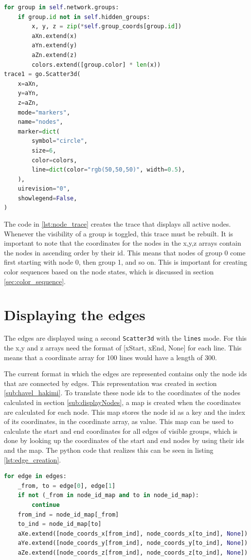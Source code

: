 \begin{lstlisting}[language=python, caption={Creation of the node trace}, label={lst:node_trace}]
for group in self.network.groups:
    if group.id not in self.hidden_groups:
        x, y, z = zip(*self.group_coords[group.id])
        aXn.extend(x)
        aYn.extend(y)
        aZn.extend(z)
        colors.extend([group.color] * len(x))
trace1 = go.Scatter3d(
    x=aXn,
    y=aYn,
    z=aZn,
    mode="markers",
    name="nodes",
    marker=dict(
        symbol="circle",
        size=6,
        color=colors,
        line=dict(color="rgb(50,50,50)", width=0.5),
    ),
    uirevision="0",
    showlegend=False,
)
\end{lstlisting}

The code in \ref{lst:node_trace} creates the trace that displays all active nodes. Whenever the visibility of a group is toggled, this trace must be rebuilt. It is important to note that the coordinates for the nodes in the x,y,z arrays contain the nodes in ascending order by their id. This means that nodes of group 0 come first starting with node 0, then group 1, and so on. This is important for creating color sequences based on the node states, which is discussed in section \ref{sec:color_sequence}.

\section{Displaying the edges}
The edges are displayed using a second \texttt{Scatter3d} with the \texttt{lines} mode. For this the x,y and z arrays need the format of [xStart, xEnd, None] for each line. This means that a coordinate array for 100 lines would have a length of 300.

The current format in which the edges are represented contains only the node ids that are connected by edges. This representation was created in section \ref{sub:havel_hakimi}. To translate these node ids to the coordinates of the nodes calculated in section \ref{sub:displayNodes}, a map is created when the coordinates are calculated for each node. This map stores the node id as a key and the index of its coordinates, in the coordinate array, as value. This map can be used to calculate the start and end coordinates for all edges of visible groups, which is done by looking up the coordinates of the start and end nodes by using their ids and the map. The python code that realizes this can be seen in listing \ref{lst:edge_creation}.
\begin{lstlisting}[language=python, caption={Creation of the edge coordinate arrays}, label={lst:edge_creation}]
 for edge in edges:
    _from, to = edge[0], edge[1]
    if not (_from in node_id_map and to in node_id_map):
        continue
    from_ind = node_id_map[_from]
    to_ind = node_id_map[to]
    aXe.extend([node_coords_x[from_ind], node_coords_x[to_ind], None])
    aYe.extend([node_coords_y[from_ind], node_coords_y[to_ind], None])
    aZe.extend([node_coords_z[from_ind], node_coords_z[to_ind], None])
\end{lstlisting}

